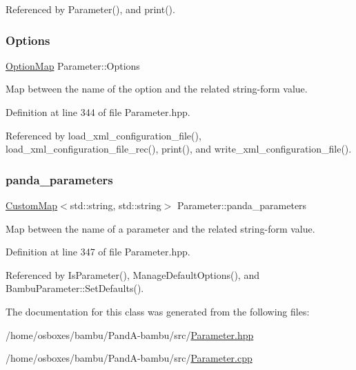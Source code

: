 Referenced by Parameter(), and print().

\mbox{\label{classParameter_ab39f7eae462485611a98baa3070cab82}} 
\subsubsection{\texorpdfstring{Options}{Options}}
{\footnotesize\ttfamily \hyperlink{classOptionMap}{Option\+Map} Parameter\+::\+Options\hspace{0.3cm}{\ttfamily [protected]}}



Map between the name of the option and the related string-\/form value. 



Definition at line 344 of file Parameter.\+hpp.



Referenced by load\+\_\+xml\+\_\+configuration\+\_\+file(), load\+\_\+xml\+\_\+configuration\+\_\+file\+\_\+rec(), print(), and write\+\_\+xml\+\_\+configuration\+\_\+file().

\mbox{\label{classParameter_a188d59f2efe50b1de6513a908c01d999}} 
\subsubsection{\texorpdfstring{panda\+\_\+parameters}{panda\_parameters}}
{\footnotesize\ttfamily \hyperlink{custom__map_8hpp_a18ca01763abbe3e5623223bfe5aaac6b}{Custom\+Map}$<$std\+::string, std\+::string$>$ Parameter\+::panda\+\_\+parameters\hspace{0.3cm}{\ttfamily [protected]}}



Map between the name of a parameter and the related string-\/form value. 



Definition at line 347 of file Parameter.\+hpp.



Referenced by Is\+Parameter(), Manage\+Default\+Options(), and Bambu\+Parameter\+::\+Set\+Defaults().



The documentation for this class was generated from the following files\+:\begin{DoxyCompactItemize}
\item 
/home/osboxes/bambu/\+Pand\+A-\/bambu/src/\hyperlink{Parameter_8hpp}{Parameter.\+hpp}\item 
/home/osboxes/bambu/\+Pand\+A-\/bambu/src/\hyperlink{Parameter_8cpp}{Parameter.\+cpp}\end{DoxyCompactItemize}
